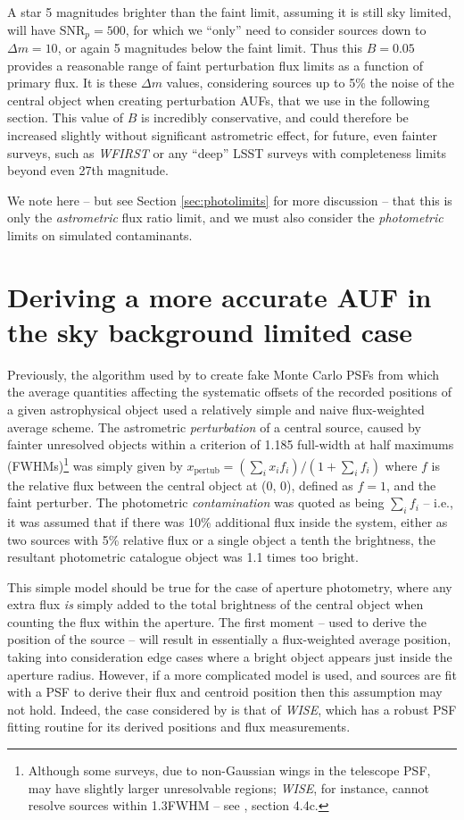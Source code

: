 \documentclass[fleqn,usenatbib]{mnras}
\begin{document}
A star 5 magnitudes brighter than the faint limit, assuming it is still sky limited, will have
$\mathrm{SNR}_p = 500$, for which we ``only'' need to consider sources down to $\Delta m = 10$, or again 5 magnitudes below the faint limit.  Thus this $B=0.05$ provides a reasonable range of faint perturbation flux limits as a function of primary flux. It is these $\Delta m$ values, considering sources up to 5\% the noise of the central object when creating perturbation AUFs, that we use in the following section. This value of $B$ is incredibly conservative, and could therefore be increased slightly without significant astrometric effect, for future, even fainter surveys, such as \textit{WFIRST} or any ``deep'' LSST surveys with completeness limits beyond even 27th magnitude.

We note here -- but see Section \ref{sec:photolimits} for more discussion -- that this is only the \textit{astrometric} flux ratio limit, and we must also consider the \textit{photometric} limits on simulated contaminants.

\section{Deriving a more accurate AUF in the sky background limited case}
\label{sec:loglfit}
Previously, the algorithm used by \cite{2018MNRAS.481.2148W} to create fake Monte Carlo PSFs from which the average quantities affecting the systematic offsets of the recorded positions of a given astrophysical object used a relatively simple and naive flux-weighted average scheme. The astrometric \textit{perturbation} of a central source, caused by fainter unresolved objects within a \citet{1880MNRAS..40..254R} criterion of 1.185 full-width at half maximums (FWHMs)\footnote{Although some surveys, due to non-Gaussian wings in the telescope PSF, may have slightly larger unresolvable regions; \textit{WISE}, for instance, cannot resolve sources within 1.3FWHM -- see \citet{Cutri:2012aa}, section 4.4c.} was simply given by $x_\mathrm{pertub} = (\sum_i x_i f_i) / (1 + \sum_i f_i)$ where $f$ is the relative flux between the central object at (0, 0), defined as $f=1$, and the faint perturber. The photometric \textit{contamination} was quoted as being $\sum_i f_i$ -- i.e., it was assumed that if there was 10\% additional flux inside the system, either as two sources with 5\% relative flux or a single object a tenth the brightness, the resultant photometric catalogue object was 1.1 times too bright.

This simple model should be true for the case of aperture photometry, where any extra flux \textit{is} simply added to the total brightness of the central object when counting the flux within the aperture. The first moment -- used to derive the position of the source -- will result in essentially a flux-weighted average position, taking into consideration edge cases where a bright object appears just inside the aperture radius. However, if a more complicated model is used, and sources are fit with a PSF to derive their flux and centroid position then this assumption may not hold. Indeed, the case considered by \citet{2018MNRAS.481.2148W} is that of \textit{WISE}, which has a robust PSF fitting routine for its derived positions and flux measurements.
\end{document}
